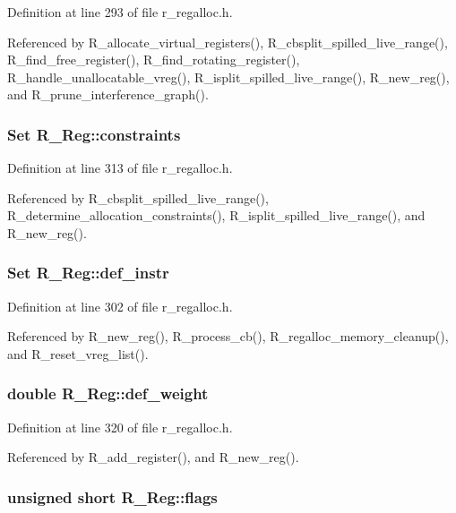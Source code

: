 Definition at line 293 of file r\_\-regalloc.h.

Referenced by R\_\-allocate\_\-virtual\_\-registers(), R\_\-cbsplit\_\-spilled\_\-live\_\-range(), R\_\-find\_\-free\_\-register(), R\_\-find\_\-rotating\_\-register(), R\_\-handle\_\-unallocatable\_\-vreg(), R\_\-isplit\_\-spilled\_\-live\_\-range(), R\_\-new\_\-reg(), and R\_\-prune\_\-interference\_\-graph().
\subsubsection{\setlength{\rightskip}{0pt plus 5cm}\bf{Set} \bf{R\_\-Reg::constraints}}\label{structR__Reg_bd27b993f77a622ffa832bbc5ba9e84a}




Definition at line 313 of file r\_\-regalloc.h.

Referenced by R\_\-cbsplit\_\-spilled\_\-live\_\-range(), R\_\-determine\_\-allocation\_\-constraints(), R\_\-isplit\_\-spilled\_\-live\_\-range(), and R\_\-new\_\-reg().
\subsubsection{\setlength{\rightskip}{0pt plus 5cm}\bf{Set} \bf{R\_\-Reg::def\_\-instr}}\label{structR__Reg_44fee66ef752ebd9a7b352d7bbead74b}




Definition at line 302 of file r\_\-regalloc.h.

Referenced by R\_\-new\_\-reg(), R\_\-process\_\-cb(), R\_\-regalloc\_\-memory\_\-cleanup(), and R\_\-reset\_\-vreg\_\-list().
\subsubsection{\setlength{\rightskip}{0pt plus 5cm}double \bf{R\_\-Reg::def\_\-weight}}\label{structR__Reg_0cd0f70e6d8a8d979393760deda8ff69}




Definition at line 320 of file r\_\-regalloc.h.

Referenced by R\_\-add\_\-register(), and R\_\-new\_\-reg().
\subsubsection{\setlength{\rightskip}{0pt plus 5cm}unsigned short \bf{R\_\-Reg::flags}}\label{structR__Reg_c921ae02a10b8e7fcf2c0ccc10fe5404}




